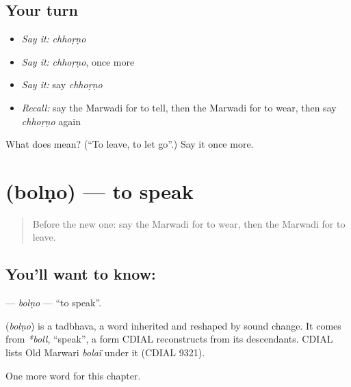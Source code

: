 \subsection*{Your turn}
\begin{itemize}
\raggedright
  \item \emph{Say it:} \emph{chhoṛṇo}
  \item \emph{Say it:} \emph{chhoṛṇo}, once more
  \item \emph{Say it:} say \emph{chhoṛṇo}
  \item \emph{Recall:} say the Marwadi for to tell, then the Marwadi for to wear, then say \emph{chhoṛṇo} again
\end{itemize}

\begin{tcolorbox}[breakable,colback=teal!4,colframe=teal!35!black,title={Before you move on}]
What does  mean? (\textquotedblleft{}To leave, to let go\textquotedblright{}.) Say it once more.
\end{tcolorbox}
\section[\texorpdfstring{\mw{बोलणो} (bolṇo)}{बोलणो (bolṇo)}]{ (bolṇo) — to speak}

\label{lesson:MW-C57-bolno}



\begin{quote}
Before the new one: say the Marwadi for to wear, then the Marwadi for to leave.
\end{quote}

\subsection*{You'll want to know: }
\textbf{} — \emph{bolṇo} — \textquotedblleft{}to speak\textquotedblright{}.

\begin{cousinweb}
\textbf{} (\emph{bolṇo}) is a tadbhava, a word inherited and reshaped by sound change. It comes from \emph{*boll}, \textquotedblleft{}speak\textquotedblright{}, a form CDIAL reconstructs from its descendants. CDIAL lists Old Marwari \emph{bolaï} under it (CDIAL 9321).
\end{cousinweb}

\begin{grammarlens}[title={What you've built}]
One more word for this chapter.
\end{grammarlens}

